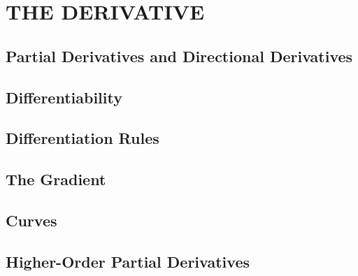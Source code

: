 \section{THE DERIVATIVE}
\subsection{Partial Derivatives and Directional Derivatives}

\subsection{Differentiability}

\subsection{Differentiation Rules}

\subsection{The Gradient}

\subsection{Curves}

\subsection{Higher-Order Partial Derivatives}
